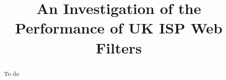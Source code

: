 \documentclass{bmcart}
\begin{document}
\begin{frontmatter}

\begin{fmbox}

\title{An Investigation of the Performance of UK ISP Web Filters}

\author[
   addressref={lancs},                   %
   corref={lancs},                       %
   email={m.rowe@lancaster.ac.uk}   %
]{ }
\author[
   addressref={org},                   %
   corref={org},                       %
   email={richard@openrightsgroup.org}   %
]{ }

\address[id=lancs]{%
  , %
  ,                     %
  ,                              %
}
\address[id=org]{%
  , %
  ,                     %
  ,                              %
}

\end{fmbox}%

\begin{abstractbox}

\begin{abstract} %
To do
\end{abstract}


\begin{keyword}
\end{keyword}


\end{abstractbox}
%

\end{frontmatter}
\end{document}
